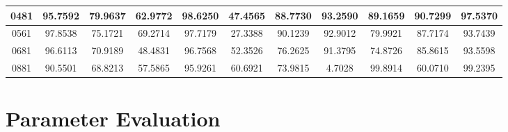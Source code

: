 \begin{appendices}
\begin{table}
\begin{tabular}{ |c|c|c|c|c|c|c|c|c|c|c| }
\hline
0481 &  95.7592 &  79.9637 &   62.9772 &  98.6250 &   47.4565 &  88.7730 &   93.2590 &  89.1659 &   90.7299 &  97.5370    \\
\hline
0561 &  97.8538 &  75.1721 &   69.2714 &  97.7179 &   27.3388 &  90.1239 &   92.9012 &  79.9921 &   87.7174 &  93.7439   \\
\hline
0681 &  96.6113 &  70.9189 &   48.4831 &  96.7568 &   52.3526 &  76.2625 &   91.3795 &  74.8726 &   85.8615 &  93.5598    \\
\hline
0881 &  90.5501 &  68.8213 &   57.5865 &  95.9261 &   60.6921 &  73.9815 &   4.7028 &  99.8914 &   60.0710 &  99.2395    \\

\hline
\end{tabular}

\end{table}

\chapter{Parameter Evaluation}
\clearpage
\FloatBarrier
\begin{figure}


\end{figure}
\end{appendices}
